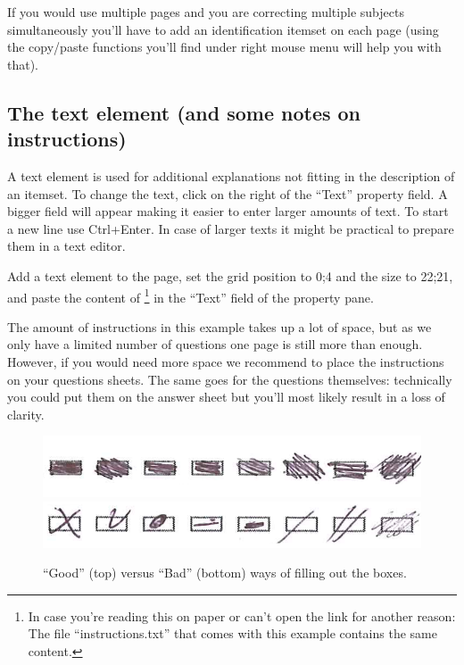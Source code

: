 \documentclass[10pt,a4paper]{article}
\begin{document}
If you would use multiple pages and you are correcting multiple subjects simultaneously you'll have to add an identification itemset on each page (using the copy/paste functions you'll find under right mouse menu will help you with that).

\subsection*{The text element (and some notes on instructions)}

A text element is used for additional explanations not fitting in the description of an itemset. To change the text, click on the right of the ``Text'' property field. A bigger field will appear making it easier to enter larger amounts of text. To start a new line use Ctrl+Enter. In case of larger texts it might be practical to prepare them in a text editor.

Add a text element to the page, set the grid position to 0;4 and the size to 22;21, and paste the content of \footnote{In case you're reading this on paper or can't open the link for another reason: The file ``instructions.txt'' that comes with this example contains the same content.} in the ``Text'' field of the property pane.

The amount of instructions in this example takes up a lot of space, but as we only have a limited number of questions one page is still more than enough. However, if you would need more space we recommend to place the instructions on your questions sheets. The same goes for the questions themselves: technically you could put them on the answer sheet but you'll most likely result in a loss of clarity.

\begin{figure}
\centering
\vspace{-25pt}
\includegraphics[scale=1]{other/good.png}\\
\includegraphics[scale=1]{other/bad.png}
\caption{``Good'' (top) versus ``Bad'' (bottom) ways of filling out the boxes.}
\vspace{-5pt}
\label{fig:goodbad}
\end{figure}
\end{document}
